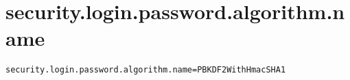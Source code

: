 \section{security.login.password.algorithm.name}
\label{configuration:SecurityLoginPasswordAlgorithmName}
\ClearAPI
\TODO
{}
\begin{lstlisting}[style=Props,caption={Usage example for \textit{security.login.password.algorithm.name}}]
security.login.password.algorithm.name=PBKDF2WithHmacSHA1
\end{lstlisting}